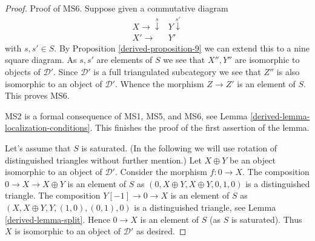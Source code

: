 \begin{proof}
\medskip\noindent
Proof of MS6. Suppose given a commutative diagram
$$
\begin{array}{cc}X \longrightarrow\overset{s}{\downarrow} & Y \overset{s'}{\downarrow} \\ X' \longrightarrow & Y'\end{array}
$$
with $s, s' \in S$. By
Proposition \ref{derived-proposition-9}
we can extend this to a nine square diagram. As $s, s'$ are elements of $S$
we see that $X'', Y''$ are isomorphic to objects of $\mathcal{D}'$.
Since $\mathcal{D}'$ is a full triangulated subcategory we see that
$Z''$ is also isomorphic to an object of $\mathcal{D}'$.
Whence the morphism $Z \to Z'$
is an element of $S$. This proves MS6.

\medskip\noindent
MS2 is a formal consequence of MS1, MS5, and MS6, see
Lemma \ref{derived-lemma-localization-conditions}.
This finishes the proof of the first assertion of the lemma.

\medskip\noindent
Let's assume that $S$ is saturated. (In the following we will use
rotation of distinguished triangles without further mention.)
Let $X \oplus Y$ be an object isomorphic to an object of $\mathcal{D}'$.
Consider the morphism $f : 0 \to X$. The composition
$0 \to X \to X \oplus Y$ is an element
of $S$ as $(0, X \oplus Y, X \oplus Y, 0, 1, 0)$ is a distinguished
triangle. The composition $Y[-1] \to 0 \to X$ is an element of $S$
as $(X, X \oplus Y, Y, (1, 0), (0, 1), 0)$ is a distinguished triangle, see
Lemma \ref{derived-lemma-split}.
Hence $0 \to X$ is an element of $S$ (as $S$ is saturated).
Thus $X$ is isomorphic to an object of $\mathcal{D}'$ as desired.


\end{proof}

